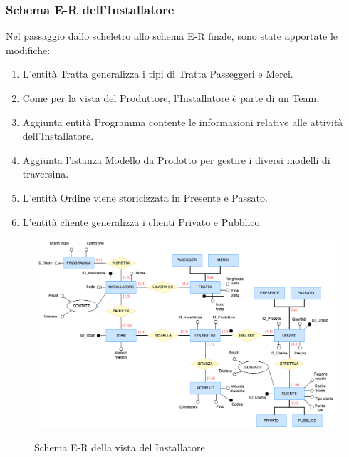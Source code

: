 \documentclass{article}
\begin{document}
\subsubsection{Schema E-R dell'Installatore}
Nel passaggio dallo scheletro allo schema E-R finale, sono state apportate le modifiche:
\begin{enumerate}
    \item L'entità Tratta generalizza i tipi di Tratta Passeggeri e Merci.
    \item Come per la vista del Produttore, l'Installatore è parte di un Team.
    \item Aggiunta entità Programma contente le informazioni relative alle attività dell'Installatore.
    \item Aggiunta l'istanza Modello da Prodotto per gestire i diversi modelli di traversina.
    \item L'entità Ordine viene storicizzata in Presente e Passato.
    \item L'entità cliente generalizza i clienti Privato e Pubblico.
\end{enumerate}

\begin{figure}[H]
    \centering
    \includegraphics[width=15cm]{images/rivisto_installatore.drawio.png}\\
    \caption{Schema E-R della vista del Installatore}
\end{figure}
\end{document}
